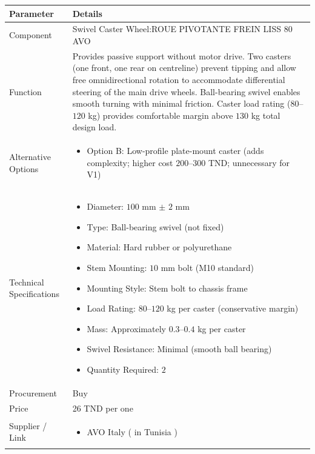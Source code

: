 \documentclass[12pt,a4paper]{article}
\begin{document}
\begin{longtable}{|p{4cm}|p{10cm}|}
\hline
\textbf{Parameter} & \textbf{Details} \\
\hline

Component &
Swivel Caster Wheel:ROUE PIVOTANTE FREIN LISS 80 AVO
\\
\hline

Function &
Provides passive support without motor drive. Two casters (one front, one rear on centreline) prevent tipping and allow free omnidirectional rotation to accommodate differential steering of the main drive wheels. Ball-bearing swivel enables smooth turning with minimal friction. Caster load rating ($80$--$120$ kg) provides comfortable margin above $130$ kg total design load. \\
\hline

Alternative Options &
\begin{itemize}
\item Option B: Low-profile plate-mount caster (adds complexity; higher cost $200$--$300$ TND; unnecessary for V1)
\end{itemize}
\\
\hline

Technical Specifications &
\begin{itemize}
\item Diameter: $100$ mm $\pm$ $2$ mm
\item Type: Ball-bearing swivel (not fixed)
\item Material: Hard rubber or polyurethane
\item Stem Mounting: $10$ mm bolt (M10 standard)
\item Mounting Style: Stem bolt to chassis frame
\item Load Rating: $80$--$120$ kg per caster (conservative margin)
\item Mass: Approximately $0.3$--$0.4$ kg per caster
\item Swivel Resistance: Minimal (smooth ball bearing)
\item Quantity Required: $2$
\end{itemize}
\\
\hline

Procurement &
Buy \\
\hline

Price &
26 TND per one \\
\hline

Supplier / Link &
\begin{itemize}
\item AVO Italy ( in Tunisia )
\end{itemize}
\\
\hline


\end{longtable}
\end{document}
